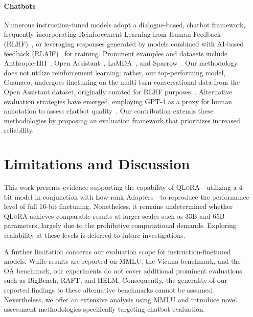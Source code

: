\paragraph{Chatbots} Numerous instruction-tuned models adopt a dialogue-based, chatbot framework, frequently incorporating Reinforcement Learning from Human Feedback (RLHF)~\citep{christiano2017deep}, or leveraging responses generated by models combined with AI-based feedback (RLAIF)~\citep{bai2022constitutional} for training. Prominent examples and datasets include Anthropic-HH~\citep{askell2021general,bai2022training}, Open Assistant~\citep{kopf2023openassistant}, LaMDA~\citep{thoppilan2022lamda}, and Sparrow~\citep{glaese2022improving}. Our methodology does not utilize reinforcement learning; rather, our top-performing model, Guanaco, undergoes finetuning on the multi-turn conversational data from the Open Assistant dataset, originally curated for RLHF purposes~\citep{kopf2023openassistant}. Alternative evaluation strategies have emerged, employing GPT-4 as a proxy for human annotation to assess chatbot quality~\citep{vicuna2023,peng2023instruction}. Our contribution extends these methodologies by proposing an evaluation framework that prioritizes increased reliability.

\section{Limitations and Discussion}

This work presents evidence supporting the capability of \textsc{QLoRA}—utilizing a 4-bit model in conjunction with Low-rank Adapters—to reproduce the performance level of full 16-bit finetuning. Nonetheless, it remains undetermined whether \textsc{QLoRA} achieves comparable results at larger scales such as 33B and 65B parameters, largely due to the prohibitive computational demands. Exploring scalability at these levels is deferred to future investigations.

A further limitation concerns our evaluation scope for instruction-finetuned models. While results are reported on MMLU, the Vicuna benchmark, and the OA benchmark, our experiments do not cover additional prominent evaluations such as BigBench, RAFT, and HELM. Consequently, the generality of our reported findings to these alternative benchmarks cannot be assumed. Nevertheless, we offer an extensive analysis using MMLU and introduce novel assessment methodologies specifically targeting chatbot evaluation.

